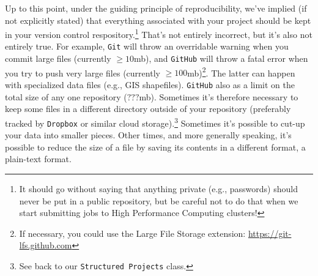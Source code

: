\documentclass[12pt,letterpaper]{article}
\begin{document}
Up to this point, under the guiding principle of reproducibility, we've implied (if not explicitly stated) that everything associated with your project should be kept in your version control respository.\footnote{It should go without saying that anything private (e.g., passwords) should never be put in a public repository, but be careful not to do that when we start submitting jobs to High Performance Computing clusters!}
That's not entirely incorrect, but it's also not entirely true.
For example, \texttt{Git} will throw an overridable warning when you commit large files (currently $\ge 10$mb), and \texttt{GitHub} will throw a fatal error when you try to push very large files (currently $\ge 100$mb)\footnote{If necessary, you could use the Large File Storage extension: \url{https://git-lfs.github.com}}.
The latter can happen with specialized data files (e.g., GIS shapefiles).
\texttt{GitHub} also as a limit on the total size of any one repository ($???$mb).
Sometimes it's therefore necessary to keep some files in a different directory outside of your repository (preferably tracked by \texttt{Dropbox} or similar cloud storage).\footnote{See back to our \texttt{Structured Projects} class.}
Sometimes it's possible to cut-up your data into smaller pieces.
Other times, and more generally speaking, it's possible to reduce the size of a file by saving its contents in a different format, a plain-text format.
\end{document}
